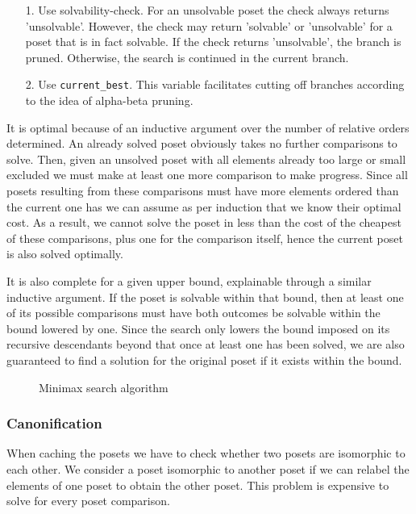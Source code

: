 \documentclass[twoside,leqno,twocolumn]{article}
\begin{document}
\begin{enumerate}
  \item[1.]
    Use solvability-check. For an unsolvable poset the check always returns 'unsolvable'.
    However, the check may return 'solvable' or 'unsolvable' for a poset that is in fact solvable.
    If the check returns 'unsolvable', the branch is pruned.
    Otherwise, the search is continued in the current branch.
  \item[2.]
    Use \texttt{current\_best}. This variable facilitates cutting off branches according to the idea of alpha-beta pruning.
\end{enumerate}

It is optimal because of an inductive argument over the number of relative orders determined.
An already solved poset obviously takes no further comparisons to solve.
Then, given an unsolved poset with all elements already too large or small excluded we must make at least one more comparison to
make progress.
Since all posets resulting from these comparisons must have more elements ordered than the current one has we can assume as per induction that we know their optimal cost.
As a result, we cannot solve the poset in less than the cost of the cheapest of these comparisons, plus one for the comparison itself, hence the current poset is also solved optimally.

It is also complete for a given upper bound, explainable through a similar inductive argument.
If the poset is solvable within that bound, then at least one of its possible comparisons must have both outcomes be solvable within the bound lowered by one.
Since the search only lowers the bound imposed on its recursive descendants beyond that once at least one has been solved, we are also guaranteed to find a solution for the original poset if it exists within the bound.

\begin{figure}[!b]
  \centering
  
  \caption{Minimax search algorithm}
  \label{fig:minimax_search}
\end{figure}

\subsubsection{Canonification}
When caching the posets we have to check whether two posets are isomorphic to each other.
We consider a poset isomorphic to another poset if we can relabel the elements of one poset to obtain the other poset.
This problem is expensive to solve for every poset comparison.
\end{document}

